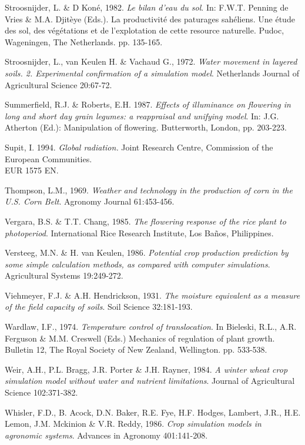 Stroosnijder, L. \& D Kon\'{e}, 1982. {\it Le bilan d'eau du sol\/}. In: F.W.T. Penning de Vries \& M.A.
Djit\`{e}ye (Eds.). La productivit\'{e} des paturages sah\'{e}liens. Une \'{e}tude des sol, des v\'{e}g\'{e}tations et de
l'explotation de cette resource naturelle. Pudoc, Wageningen, The Netherlands. pp. 135-165.

Stroosnijder, L., van Keulen H. \& Vachaud G., 1972. {\it Water movement in layered soils. 2.
Experimental confirmation of a simulation model\/}. Netherlands Journal of Agricultural Science 20:67-72.

Summerfield, R.J. \& Roberts, E.H. 1987. {\it Effects of illuminance on flowering in long and short day
grain legumes: a reappraisal and unifying model\/}. In: J.G. Atherton (Ed.): Manipulation of flowering.
Butterworth, London, pp. 203-223.

Supit, I. 1994. {\it Global radiation. \/}Joint Research Centre, Commission of the European Communities.\\
EUR 1575 EN.

Thompson, L.M., 1969. {\it Weather and technology in the production of corn in the U.S. Corn Belt\/}.
Agronomy Journal 61:453-456.

Vergara, B.S. \& T.T. Chang, 1985. {\it The flowering response of the rice plant to photoperiod\/}.
International Rice Research Institute, Los Ba\~{n}os, Philippines.

Versteeg, M.N. \& H. van Keulen, 1986. {\it Potential crop production prediction by some simple
calculation methods, as compared with computer simulations\/}. Agricultural Systems 19:249-272.

Viehmeyer, F.J. \& A.H. Hendrickson, 1931. {\it The moisture equivalent as a measure of the field
capacity of soils\/}. Soil Science 32:181-193.

Wardlaw, I.F., 1974. {\it Temperature control of translocation\/}. In Bieleski, R.L., A.R. Ferguson \&
M.M. Creswell (Eds.) Mechanics of regulation of plant growth. Bulletin 12, The Royal Society of
New Zealand, Wellington. pp. 533-538.

Weir, A.H., P.L. Bragg, J.R. Porter \& J.H. Rayner, 1984. {\it A winter wheat crop simulation model
without water and nutrient limitations\/}. Journal of Agricultural Science 102:371-382.

Whisler, F.D., B. Acock, D.N. Baker, R.E. Fye, H.F. Hodges, Lambert, J.R., H.E. Lemon, J.M.
Mckinion \& V.R. Reddy, 1986. {\it Crop simulation models in agronomic systems\/}. Advances in
Agronomy 401:141-208.

